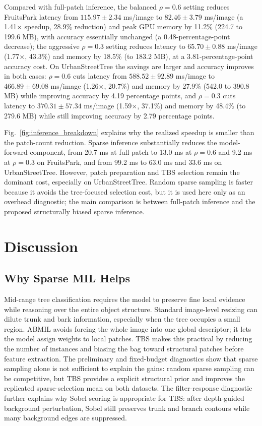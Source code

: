 \documentclass{ieeeaccess}
\begin{document}
Compared with full-patch inference, the balanced $\rho=0.6$ setting reduces FruitsPark latency from
$115.97\pm2.34$ ms/image to $82.46\pm3.79$ ms/image (a 1.41$\times$ speedup, 28.9\% reduction) and
peak GPU memory by 11.2\% (224.7 to 199.6 MB), with accuracy essentially unchanged (a
0.48-percentage-point decrease); the aggressive $\rho=0.3$ setting reduces latency to $65.70\pm0.88$
ms/image (1.77$\times$, 43.3\%) and memory by 18.5\% (to 183.2 MB), at a 3.81-percentage-point
accuracy cost. On UrbanStreetTree the savings are larger and accuracy improves in both cases:
$\rho=0.6$ cuts latency from $588.52\pm92.89$ ms/image to $466.89\pm69.08$ ms/image (1.26$\times$,
20.7\%) and memory by 27.9\% (542.0 to 390.8 MB) while improving accuracy by 4.19 percentage points,
and $\rho=0.3$ cuts latency to $370.31\pm57.34$ ms/image (1.59$\times$, 37.1\%) and memory by 48.4\%
(to 279.6 MB) while still improving accuracy by 2.79 percentage points.

Fig.~\ref{fig:inference_breakdown} explains why the realized speedup is smaller than the patch-count
reduction. Sparse inference substantially reduces the model-forward component, from 20.7 ms at full
patch to 13.0 ms at $\rho=0.6$ and 9.2 ms at $\rho=0.3$ on FruitsPark, and from 99.2 ms to 63.0 ms
and 33.6 ms on UrbanStreetTree. However, patch preparation and TBS selection remain the dominant
cost, especially on UrbanStreetTree. Random sparse sampling is faster because it avoids the
tree-focused selection cost, but it is used here only as an overhead diagnostic; the main comparison
is between full-patch inference and the proposed structurally biased sparse inference.

\FloatBarrier
\onecolumn
\twocolumn
\section{Discussion}
\label{sec:discussion}

\subsection{Why Sparse MIL Helps}
Mid-range tree classification requires the model to preserve fine local evidence while reasoning
over the entire object structure. Standard image-level resizing can dilute trunk and bark
information, especially when the tree occupies a small region. ABMIL avoids forcing the whole image
into one global descriptor; it lets the model assign weights to local patches. TBS makes this
practical by reducing the number of instances and biasing the bag toward structural patches before
feature extraction. The preliminary and fixed-budget diagnostics show that sparse sampling alone is
not sufficient to explain the gains: random sparse sampling can be competitive, but TBS provides a
explicit structural prior and improves the replicated sparse-selection mean on both datasets.
The filter-response diagnostic further explains why Sobel scoring is appropriate for TBS: after
depth-guided background perturbation, Sobel still preserves trunk and branch contours while many
background edges are suppressed.
\end{document}
